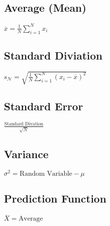 \documentclass[a4]{article}
\begin{document}
\subsection{Average (Mean)}
\(
\overline{x} = \frac{1}{N} \sum_{i=1}^{N}x_i
\)

\subsection{Standard Diviation}
\(
s_{\mathcal{N}} = \sqrt{\frac{1}{N}\sum_{i=1}^{N}(x_i - \overline{x})^2}
\)

\subsection{Standard Error}
\(
\frac{\text{Standard Divation}}{\sqrt{N}}
\)

\subsection{Variance}
\(
\sigma^{2} = \text{Random Variable} - \mu
\)

\subsection{Prediction Function}
\(
\overline{X} = \text{Average}
\)
\end{document}
